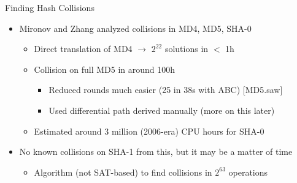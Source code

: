 \documentclass[ignorenonframetext,]{beamer}
\providecommand{\tightlist}{%
  \setlength{\itemsep}{0pt}\setlength{\parskip}{0pt}}
\newcommand{\infile}[1]{{\tiny \alert{[#1]}}}
\begin{document}
\begin{frame}{Finding Hash Collisions}

\begin{itemize}
\tightlist
\item
  Mironov and Zhang analyzed collisions in MD4, MD5, SHA-0

  \begin{itemize}
  \tightlist
  \item
    Direct translation of MD4 \(\rightarrow\) \(2^{22}\) solutions in
    \(<\) 1h
  \item
    Collision on full MD5 in around 100h

    \begin{itemize}
    \tightlist
    \item
      Reduced rounds much easier (25 in 38s with ABC) \infile{MD5.saw}
    \item
      Used differential path derived manually (more on this later)
    \end{itemize}
  \item
    Estimated around 3 million (2006-era) CPU hours for SHA-0
  \end{itemize}
\item
  No known collisions on SHA-1 from this, but it may be a matter of time

  \begin{itemize}
  \tightlist
  \item
    Algorithm (not SAT-based) to find collisions in \(2^{63}\)
    operations
  \end{itemize}
\end{itemize}

\end{frame}
\end{document}
